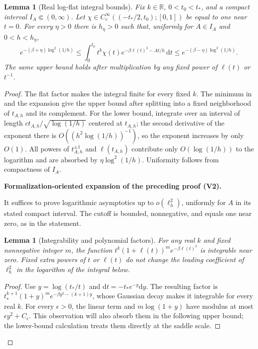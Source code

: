 \documentclass[11pt]{article}
\newtheorem{lemma}[theorem]{Lemma}
\newcommand{\formalisationparentid}{X}
\newenvironment{formalisationaddition}[1]{\par\medskip\begingroup\color{blue}\def\formalisationparentid{#1}\setcounter{formalizationsublemma}{0}\let\lemma\formalizationsublemma\let\endlemma\endformalizationsublemma
  \def\Eo{\mathcal E_h^\circ}\def\EE{\mathcal E_h}\def\phio{\phi_h^\circ}\def\phih{\phi_h}\def\Ho{H_h^{\rm atom}(v^\circ)}\def\Ha{H_h^{\rm atom}}\def\HL{H_h^{L}}\def\Dh{D_h}\def\Log{\operatorname{Log}}\def\ellh{\ell_h}\def\Gp{G_{p,h}}\def\Ast{A_{*,h}}\def\ahat{\widehat{\mathfrak a}_h}\def\ah{\mathfrak a_h}\def\rh{\widehat\rho_h}\def\deltah{\widehat\delta_h}\def\oldref##1{\textup{(##1)}}\def\interface##1{\par\noindent\textit{Analytical interface used here.} ##1\par}\def\finish{\par\noindent\textit{Conclusion of the formalization-oriented expansion.} }\par\noindent\textbf{Formalization-oriented expansion of the preceding proof (V2).}\par\smallskip
}{\par\endgroup\medskip
}
\newcommand{\R}{\mathbb R}
\newcommand{\dd}{\,\mathrm d}
\begin{document}
\begin{lemma}[Real log-flat integral bounds]\label{lem:log-flat-L1}
Fix $k\in\R$, $0<t_0<t_*$, and a compact interval
$I_A\Subset(0,\infty)$.  Let
$\chi\in C_c^\infty((-t_*/2,t_0);[0,1])$ be equal to one near $t=0$.
For every $\eta>0$ there is $h_\eta>0$ such that, uniformly
for $A\in I_A$ and $0<h<h_\eta$,
\begin{equation}\label{eq:log-flat-integral-bounds}
 e^{-(\beta+\eta)\log^2(1/h)}
 \le
 \int_0^{t_0}t^k\chi(t)
 e^{-\beta\ell(t)^2-At/h}\dd t
 \le
 e^{-(\beta-\eta)\log^2(1/h)}.
\end{equation}
The same upper bound holds after multiplication by any fixed power of
$\ell(t)$ or $t^{-1}$.
\end{lemma}

\begin{proof}
The flat factor makes the integral finite for every fixed $k$.  The minimum
in  and the expansion
 give the upper bound after splitting into a fixed
neighborhood of $t_{A,h}$ and its complement.  For the lower bound, integrate
over an interval of length $ct_{A,h}/\sqrt{\log(1/h)}$ centered at
$t_{A,h}$; the second derivative of the exponent there is
$O((h^2\log(1/h))^{-1})$, so the exponent increases by only $O(1)$.
All powers of $t_{A,h}^{\pm1}$ and $\ell(t_{A,h})$ contribute only
$O(\log(1/h))$ to the logarithm and are absorbed by $\eta\log^2(1/h)$.
Uniformity follows from compactness of $I_A$.

\begin{formalisationaddition}{L2.8}
It suffices to prove logarithmic asymptotics up to $o(\ell_h^2)$, uniformly for $A$ in its stated compact interval. The cutoff is bounded, nonnegative, and equals one near zero, as in the statement.

\begin{lemma}[Integrability and polynomial factors]\label{sublemma:L2-8-integrability}
For any real $k$ and fixed nonnegative integer $m$, the function
$t^k(1+\ell(t))^m e^{-\beta\ell(t)^2}$ is integrable near zero. Fixed extra powers of $t$ or $\ell(t)$ do not change the leading coefficient of $\ell_h^2$ in the logarithm of the integral below.
\end{lemma}
\begin{proof}
Use $y=\log(t_*/t)$ and $\mathrm dt=-t_*e^{-y}\mathrm dy$. The resulting factor is
$t_*^{k+1}(1+y)^m e^{-\beta y^2-(k+1)y}$, whose Gaussian decay makes it integrable for every real $k$. For every $\epsilon>0$, the linear term and $m\log(1+y)$ have modulus at most $\epsilon y^2+C_\epsilon$. This observation will also absorb them in the following upper bound; the lower-bound calculation treats them directly at the saddle scale.
\end{proof}


\end{formalisationaddition}
\end{proof}
\end{document}
